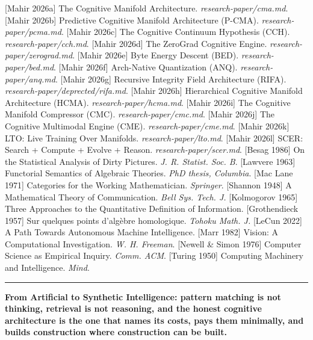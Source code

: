 \documentclass[
  11pt,
  a4paper,
]{article}
\begin{document}
{[}Mahir 2026a{]} The Cognitive Manifold Architecture.
\emph{research-paper/cma.md}. {[}Mahir 2026b{]} Predictive Cognitive
Manifold Architecture (P-CMA). \emph{research-paper/pcma.md}. {[}Mahir
2026c{]} The Cognitive Continuum Hypothesis (CCH).
\emph{research-paper/cch.md}. {[}Mahir 2026d{]} The ZeroGrad Cognitive
Engine. \emph{research-paper/zerograd.md}. {[}Mahir 2026e{]} Byte Energy
Descent (BED). \emph{research-paper/bed.md}. {[}Mahir 2026f{]}
Arch-Native Quantization (ANQ). \emph{research-paper/anq.md}. {[}Mahir
2026g{]} Recursive Integrity Field Architecture (RIFA).
\emph{research-paper/deprected/rifa.md}. {[}Mahir 2026h{]} Hierarchical
Cognitive Manifold Architecture (HCMA). \emph{research-paper/hcma.md}.
{[}Mahir 2026i{]} The Cognitive Manifold Compressor (CMC).
\emph{research-paper/cmc.md}. {[}Mahir 2026j{]} The Cognitive Multimodal
Engine (CME). \emph{research-paper/cme.md}. {[}Mahir 2026k{]} LTO: Live
Training Over Manifolds. \emph{research-paper/lto.md}. {[}Mahir 2026l{]}
SCER: Search + Compute + Evolve + Reason. \emph{research-paper/scer.md}.
{[}Besag 1986{]} On the Statistical Analysis of Dirty Pictures. \emph{J.
R. Statist. Soc. B}. {[}Lawvere 1963{]} Functorial Semantics of
Algebraic Theories. \emph{PhD thesis, Columbia}. {[}Mac Lane 1971{]}
Categories for the Working Mathematician. \emph{Springer}. {[}Shannon
1948{]} A Mathematical Theory of Communication. \emph{Bell Sys. Tech.
J.} {[}Kolmogorov 1965{]} Three Approaches to the Quantitative
Definition of Information. {[}Grothendieck 1957{]} Sur quelques points
d'algèbre homologique. \emph{Tohoku Math. J.} {[}LeCun 2022{]} A Path
Towards Autonomous Machine Intelligence. {[}Marr 1982{]} Vision: A
Computational Investigation. \emph{W. H. Freeman}. {[}Newell \& Simon
1976{]} Computer Science as Empirical Inquiry. \emph{Comm. ACM}.
{[}Turing 1950{]} Computing Machinery and Intelligence. \emph{Mind}.

\begin{center}\rule{0.5\linewidth}{0.5pt}\end{center}

\textbf{From Artificial to Synthetic Intelligence: pattern matching is
not thinking, retrieval is not reasoning, and the honest cognitive
architecture is the one that names its costs, pays them minimally, and
builds construction where construction can be built.}
\end{document}
